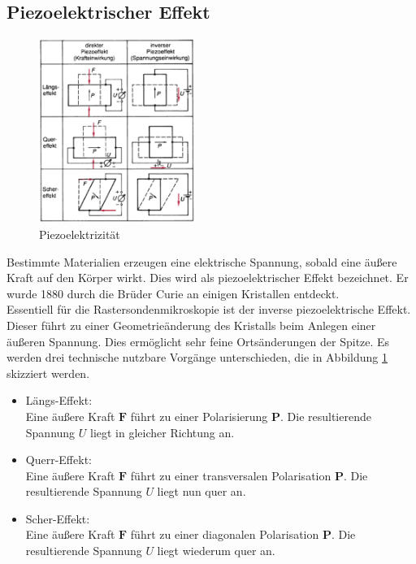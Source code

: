     \subsection{Piezoelektrischer Effekt}

\begin{figure}
    \includegraphics[width=0.45\textwidth]{Abb/piezo.png}
    \caption{Piezoelektrizität \cite{phying}}
    \label{piezo}
\end{figure}
Bestimmte Materialien erzeugen eine elektrische Spannung, sobald eine äußere Kraft
auf den Körper wirkt. Dies wird als piezoelektrischer Effekt bezeichnet. Er wurde
1880 durch die Brüder Curie an einigen Kristallen entdeckt.\\
Essentiell für die Rastersondenmikroskopie ist der inverse piezoelektrische Effekt.
Dieser führt zu einer Geometrieänderung des Kristalls beim Anlegen einer äußeren 
Spannung. Dies ermöglicht sehr feine Ortsänderungen der Spitze. Es werden drei 
technische nutzbare Vorgänge unterschieden, die in Abbildung \ref{piezo} skizziert
werden.
\begin{itemize}
    \item Längs-Effekt:\\
          Eine äußere Kraft $\textbf{F}$ führt zu einer Polarisierung $\textbf{P}$.
          Die resultierende Spannung $U$ liegt in gleicher Richtung an.
    \item Querr-Effekt:\\
          Eine äußere Kraft $\textbf{F}$ führt zu einer transversalen Polarisation
          $\textbf{P}$. Die resultierende Spannung $U$ liegt nun quer an.
    \item Scher-Effekt:\\
          Eine äußere Kraft $\textbf{F}$ führt zu einer diagonalen Polarisation
          $\textbf{P}$. Die resultierende Spannung $U$ liegt wiederum quer an.
\end{itemize}
